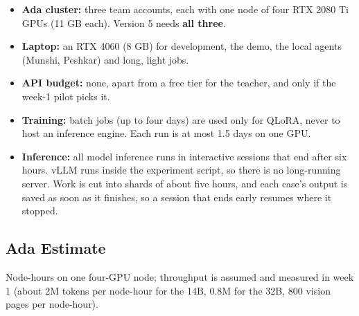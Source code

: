 \documentclass[10pt,a4paper]{article}
\begin{document}
\begin{itemize}
\item \textbf{Ada cluster:} three team accounts, each with one node of four RTX 2080 Ti GPUs (11 GB each). Version 5 needs \textbf{all three}.
\item \textbf{Laptop:} an RTX 4060 (8 GB) for development, the demo, the local agents (Munshi, Peshkar) and long, light jobs.
\item \textbf{API budget:} none, apart from a free tier for the teacher, and only if the week-1 pilot picks it.
\item \textbf{Training:} batch jobs (up to four days) are used only for QLoRA, never to host an inference engine. Each run is at most 1.5 days on one GPU.
\item \textbf{Inference:} all model inference runs in interactive sessions that end after six hours. vLLM runs inside the experiment script, so there is no long-running server. Work is cut into shards of about five hours, and each case's output is saved as soon as it finishes, so a session that ends early resumes where it stopped.
\end{itemize}

\subsection{Ada Estimate}

Node-hours on one four-GPU node; throughput is assumed and measured in week 1 (about 2M tokens per node-hour for the 14B, 0.8M for the 32B, 800 vision pages per node-hour).
\end{document}
